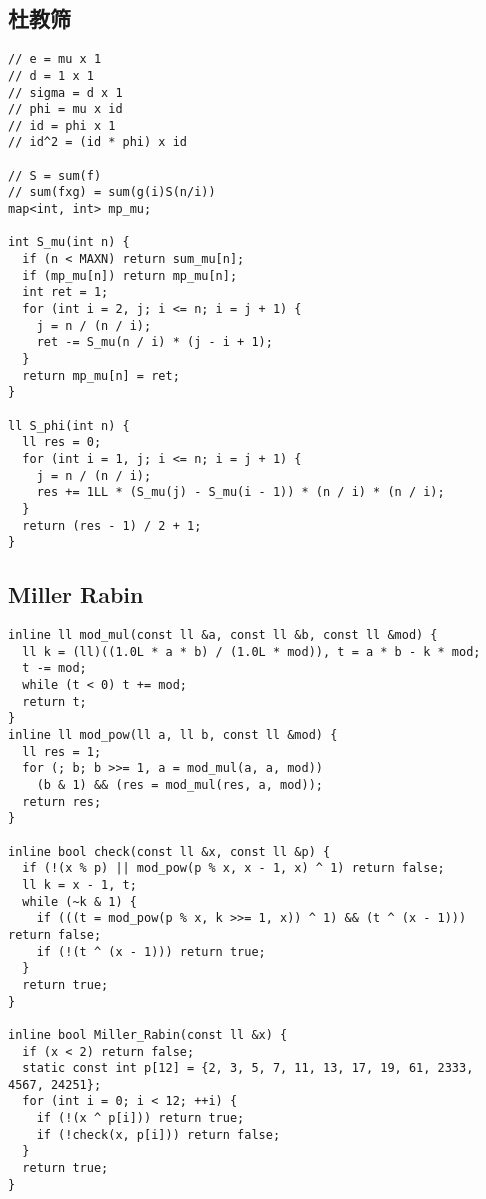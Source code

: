\documentclass[twoside]{article}
\begin{document}
\subsection{杜教筛}
\begin{lstlisting}
// e = mu x 1
// d = 1 x 1
// sigma = d x 1
// phi = mu x id
// id = phi x 1
// id^2 = (id * phi) x id

// S = sum(f)
// sum(fxg) = sum(g(i)S(n/i))
map<int, int> mp_mu;

int S_mu(int n) {
  if (n < MAXN) return sum_mu[n];
  if (mp_mu[n]) return mp_mu[n];
  int ret = 1;
  for (int i = 2, j; i <= n; i = j + 1) {
    j = n / (n / i);
    ret -= S_mu(n / i) * (j - i + 1);
  }
  return mp_mu[n] = ret;
}

ll S_phi(int n) {
  ll res = 0;
  for (int i = 1, j; i <= n; i = j + 1) {
    j = n / (n / i);
    res += 1LL * (S_mu(j) - S_mu(i - 1)) * (n / i) * (n / i);
  }
  return (res - 1) / 2 + 1;
}

\end{lstlisting}
\subsection{Miller Rabin}
\begin{lstlisting}
inline ll mod_mul(const ll &a, const ll &b, const ll &mod) {
  ll k = (ll)((1.0L * a * b) / (1.0L * mod)), t = a * b - k * mod;
  t -= mod;
  while (t < 0) t += mod;
  return t;
}
inline ll mod_pow(ll a, ll b, const ll &mod) {
  ll res = 1;
  for (; b; b >>= 1, a = mod_mul(a, a, mod))
    (b & 1) && (res = mod_mul(res, a, mod));
  return res;
}

inline bool check(const ll &x, const ll &p) {
  if (!(x % p) || mod_pow(p % x, x - 1, x) ^ 1) return false;
  ll k = x - 1, t;
  while (~k & 1) {
    if (((t = mod_pow(p % x, k >>= 1, x)) ^ 1) && (t ^ (x - 1))) return false;
    if (!(t ^ (x - 1))) return true;
  }
  return true;
}

inline bool Miller_Rabin(const ll &x) {
  if (x < 2) return false;
  static const int p[12] = {2, 3, 5, 7, 11, 13, 17, 19, 61, 2333, 4567, 24251};
  for (int i = 0; i < 12; ++i) {
    if (!(x ^ p[i])) return true;
    if (!check(x, p[i])) return false;
  }
  return true;
}

\end{lstlisting}
\end{document}
